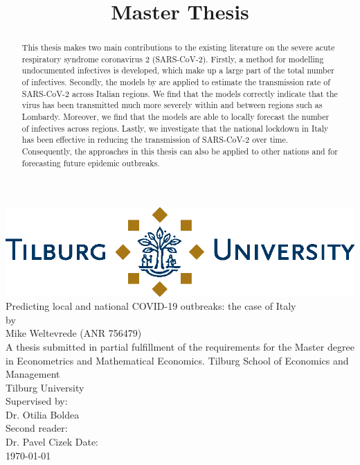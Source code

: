\documentclass[12pt]{article}
\title{Master Thesis}
\newcommand\blankpage{
	\null
	\thispagestyle{empty}
	\addtocounter{page}{-1}
	\newpage}
\begin{document}
	
	\afterpage{\blankpage}
	
	\begin{titlepage}
		\centering
		
		\vfill
		
		\includegraphics[width=0.94\linewidth]{output/TiuLogo.eps}
		\vskip1.5cm
		{\huge
			Predicting local and national COVID-19 outbreaks: the case of Italy \\
			\large\bigskip
			by\\
			Mike Weltevrede (ANR 756479)\\
			\vskip1.5cm
			A thesis submitted in partial fulfillment of the requirements for the Master degree in Econometrics and Mathematical Economics.
			\vskip0.5cm
			Tilburg School of Economics and Management\\
			Tilburg University\\
			\vskip1.5cm
			Supervised by:\\
			Dr. Otilia Boldea \\
			\vskip0.5cm
			Second reader:\\
			Dr. Pavel Cizek
			\vfill
			Date:\\
			\today
		}   
		\vfill
		\vfill
	\end{titlepage}
	
	\newpage
	
	\newpage
	
	\begin{abstract}
		This thesis makes two main contributions to the existing literature on the severe acute respiratory syndrome coronavirus 2 (SARS-CoV-2). Firstly, a method for modelling undocumented infectives is developed, which \textcite{li2020undocumented} make up a large part of the total number of infectives. Secondly, the models by \textcite{adda2016economic} are applied to estimate the transmission rate of SARS-CoV-2 across Italian regions. We find that the models correctly indicate that the virus has been transmitted much more severely within and between regions such as Lombardy. Moreover, we find that the models are able to locally forecast the number of infectives across regions. Lastly, we investigate that the national lockdown in Italy has been effective in reducing the transmission of SARS-CoV-2 over time. Consequently, the approaches in this thesis can also be applied to other nations and for forecasting future epidemic outbreaks.
		
		
	\end{abstract}
	
\end{document}

